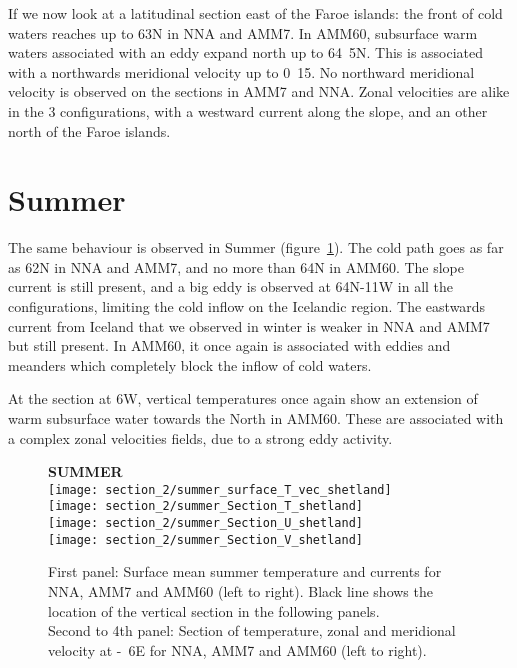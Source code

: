 \documentclass[english,11pt]{article}
\newcommand{\fig}[1]{(figure~\ref{#1})}
\begin{document}
If we now look at a latitudinal section east of the Faroe islands: the front of cold waters reaches up to \unit{63}{\degree N} in NNA and AMM7. In AMM60, subsurface warm waters associated with an eddy expand north up to \unit{64.5}{\degree N}. This is associated with a northwards meridional velocity up to \unit{0.15}{\meter\per\second}. No northward meridional velocity is observed on the sections in AMM7 and NNA. Zonal velocities are alike in the 3 configurations, with a westward current along the slope, and an other north of the Faroe islands.

\section{Summer}
The same behaviour is observed in Summer \fig{fig_summer}. The cold path goes as far as \unit{62}{\degree N} in NNA and AMM7, and no more than \unit{64}{\degree N} in AMM60. 
The slope current is still present, and a big eddy is observed at \unit{64}{\degree N}-\unit{11}{\degree W} in all the configurations, limiting the cold inflow on the Icelandic region. The eastwards current from Iceland that we observed in winter is weaker in NNA and AMM7 but still present. In AMM60, it once again is associated with eddies and meanders which completely block the inflow of cold waters.

At the section at \unit{6}{\degree W}, vertical temperatures once again show an extension of warm subsurface water towards the North in AMM60.  These are associated with a complex zonal velocities fields, due to a strong eddy activity.

\begin{figure}[h!]
	\centering \textbf{SUMMER}\\
	\texttt{[image: section\_2/summer\_surface\_T\_vec\_shetland]}\\
	\texttt{[image: section\_2/summer\_Section\_T\_shetland]}\\
	\texttt{[image: section\_2/summer\_Section\_U\_shetland]}\\
	\texttt{[image: section\_2/summer\_Section\_V\_shetland]}\\

	\caption{First panel: Surface mean summer temperature and currents for NNA, AMM7 and AMM60 (left to right). Black line shows the location of the vertical section in the following panels.\\ Second to 4th panel: Section of temperature, zonal and meridional velocity at \unit{-6}{\degree E} for NNA, AMM7 and AMM60 (left to right). }
	\label{fig_summer}
\end{figure}
\end{document}
